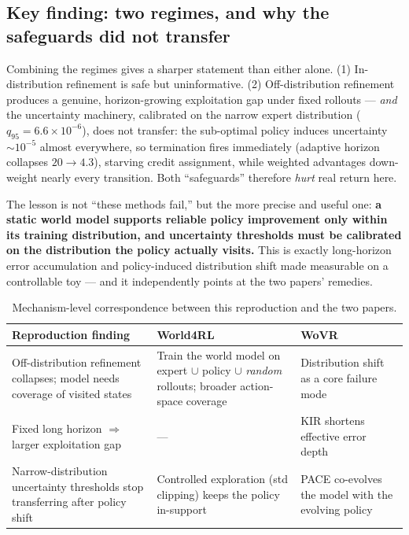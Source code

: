 \documentclass[11pt]{article}
\begin{document}
\subsection{Key finding: two regimes, and why the safeguards did not transfer}
Combining the regimes gives a sharper statement than either alone. (1) In-distribution refinement is safe
but uninformative. (2) Off-distribution refinement produces a genuine, horizon-growing exploitation gap
under fixed rollouts --- \emph{and} the uncertainty machinery, calibrated on the narrow expert
distribution ($q_{95}=6.6\times10^{-6}$), does not transfer: the sub-optimal policy induces uncertainty
$\sim10^{-5}$ almost everywhere, so termination fires immediately (adaptive horizon collapses $20\to4.3$),
starving credit assignment, while weighted advantages down-weight nearly every transition. Both
``safeguards'' therefore \emph{hurt} real return here.

The lesson is not ``these methods fail,'' but the more precise and useful one: \textbf{a static world
model supports reliable policy improvement only within its training distribution, and uncertainty
thresholds must be calibrated on the distribution the policy actually visits.} This is exactly
long-horizon error accumulation and policy-induced distribution shift made measurable on a controllable
toy --- and it independently points at the two papers' remedies.

\begin{table}[h]
\centering
\caption{Mechanism-level correspondence between this reproduction and the two papers.}
\label{tab:map}
\begin{tabular}{p{4.6cm}p{5.0cm}p{4.6cm}}
\toprule
Reproduction finding & World4RL & WoVR\\
\midrule
Off-distribution refinement collapses; model needs coverage of visited states &
Train the world model on expert $\cup$ policy $\cup$ \emph{random} rollouts; broader action-space
coverage & Distribution shift as a core failure mode\\
\addlinespace
Fixed long horizon $\Rightarrow$ larger exploitation gap &
--- & KIR shortens effective error depth\\
\addlinespace
Narrow-distribution uncertainty thresholds stop transferring after policy shift &
Controlled exploration (std clipping) keeps the policy in-support &
PACE co-evolves the model with the evolving policy\\
\bottomrule
\end{tabular}
\end{table}
\end{document}
